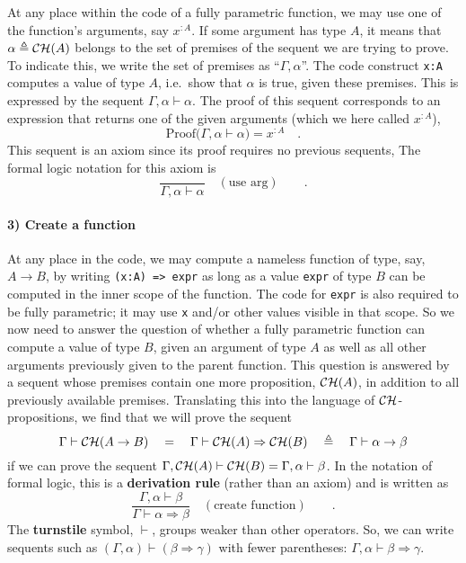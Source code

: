 At any place within the code of a fully parametric function, we may
use one of the function's arguments, say $x^{:A}$. If some argument
has type $A$, it means that $\alpha\triangleq{\cal CH}(A)$ belongs
to the set of premises of the sequent we are trying to prove. To indicate
this, we write the set of premises as ``$\Gamma,\alpha$''. The
code construct \lstinline!x:A! computes a value of type $A$, i.e.~show
that $\alpha$ is true, given these premises. This is expressed by
the sequent $\Gamma,\alpha\vdash\alpha$. The proof of this sequent
corresponds to an expression that returns one of the given arguments
(which we here called $x^{:A}$),
\[
\text{Proof}\big(\Gamma,\alpha\vdash\alpha\big)=x^{:A}\quad.
\]
This sequent is an axiom since its proof requires no previous sequents,
The formal logic notation for this axiom is
\[
\frac{~}{\Gamma,\alpha\vdash\alpha}\quad(\text{use arg})\quad\quad.
\]


\paragraph{3) Create a function}

At any place in the code, we may compute a nameless function of type,
say, $A\rightarrow B$, by writing \lstinline!(x:A) => expr! as long
as a value \lstinline!expr! of type $B$ can be computed in the inner
scope of the function. The code for \lstinline!expr! is also required
to be fully parametric; it may use \lstinline!x! and/or other values
visible in that scope. So we now need to answer the question of whether
a fully parametric function can compute a value of type $B$, given
an argument of type $A$ as well as all other arguments previously
given to the parent function. This question is answered by a sequent
whose premises contain one more proposition, ${\cal CH}(A)$, in addition
to all previously available premises. Translating this into the language
of ${\cal CH}$-propositions, we find that we will prove the sequent
\[
\Gamma\vdash{\cal CH}(A\rightarrow B)\quad=\quad\Gamma\vdash{\cal CH}(A)\Rightarrow{\cal CH}(B)\quad\triangleq\quad\Gamma\vdash\alpha\rightarrow\beta
\]
if we can prove the sequent $\Gamma,{\cal CH}(A)\vdash{\cal CH}(B)=\Gamma,\alpha\vdash\beta$.
In the notation of formal logic, this is a \textbf{derivation rule}
(rather than an axiom) and is written as
\[
\frac{\Gamma,\alpha\vdash\beta}{\Gamma\vdash\alpha\Rightarrow\beta}\quad(\text{create function})\quad\quad.
\]
The \textbf{turnstile} symbol, $\vdash$, groups
weaker than other operators. So, we can write sequents such as $(\Gamma,\alpha)\vdash(\beta\Rightarrow\gamma)$
with fewer parentheses: $\Gamma,\alpha\vdash\beta\Rightarrow\gamma$.


